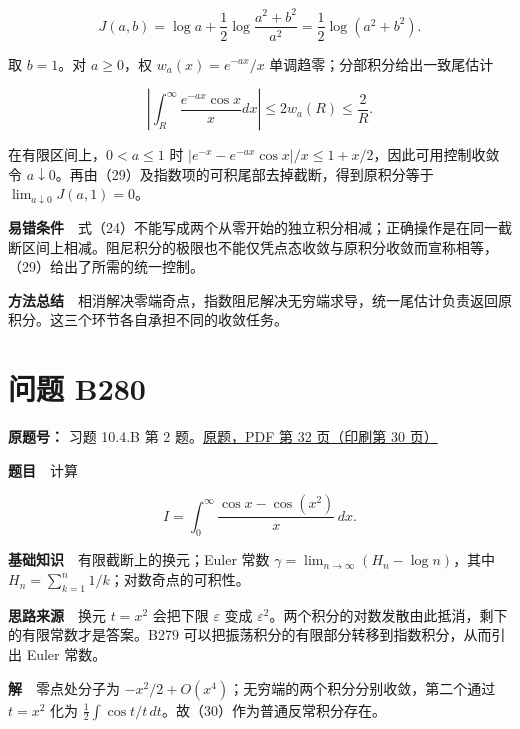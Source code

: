 \documentclass[11pt,a4paper]{article}
\begin{document}
\begin{equation}
J(a,b)=\log a+\frac12\log\frac{a^2+b^2}{a^2}
=\frac12\log(a^2+b^2).
\tag{28}
\end{equation}

取 \(b=1\)。对 \(a\ge0\)，权 \(w_a(x)=e^{-ax}/x\)
单调趋零；分部积分给出一致尾估计

\begin{equation}
\left|\int_R^\infty\frac{e^{-ax}\cos x}{x}dx\right|
\le2w_a(R)\le\frac2R.
\tag{29}
\end{equation}

在有限区间上，\(0<a\le1\) 时
\(|e^{-x}-e^{-ax}\cos x|/x\le1+x/2\)，因此可用控制收敛令
\(a\downarrow0\)。再由（29）及指数项的可积尾部去掉截断，得到原积分等于
\(\lim_{a\downarrow0}J(a,1)=0\)。

\textbf{易错条件}　式（24）不能写成两个从零开始的独立积分相减；正确操作是在同一截断区间上相减。阻尼积分的极限也不能仅凭点态收敛与原积分收敛而宣称相等，（29）给出了所需的统一控制。

\textbf{方法总结}　相消解决零端奇点，指数阻尼解决无穷端求导，统一尾估计负责返回原积分。这三个环节各自承担不同的收敛任务。

\section{问题 B280}\label{ux95eeux9898-b280}

\textbf{原题号：} 习题 10.4.B 第 2
题。\href{https://zj139.github.io/math-notes/files/problems/楼分析习题-v2.pdf\#page=32}{原题，PDF
第 32 页（印刷第 30 页）}

\textbf{题目}　计算

\begin{equation}
I=\int_0^\infty\frac{\cos x-\cos(x^2)}x\,dx.
\tag{30}
\end{equation}

\textbf{基础知识}　有限截断上的换元；Euler 常数
\(\gamma=\lim_{n\to\infty}(H_n-\log n)\)，其中
\(H_n=\sum_{k=1}^n1/k\)；对数奇点的可积性。

\textbf{思路来源}　换元 \(t=x^2\) 会把下限 \(\varepsilon\) 变成
\(\varepsilon^2\)。两个积分的对数发散由此抵消，剩下的有限常数才是答案。B279
可以把振荡积分的有限部分转移到指数积分，从而引出 Euler 常数。

\textbf{解}　零点处分子为
\(-x^2/2+O(x^4)\)；无穷端的两个积分分别收敛，第二个通过 \(t=x^2\) 化为
\(\frac12\int\cos t/t\,dt\)。故（30）作为普通反常积分存在。
\end{document}
